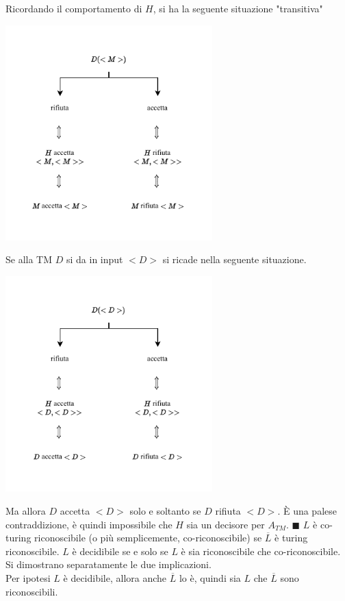 \documentclass[10pt, letterpaper]{report}
\begin{document}
Ricordando il comportamento di $H$, si ha la seguente situazione "transitiva"
\begin{center}
    \includegraphics[width=0.6\textwidth ]{images/ATMnonDec.pdf}
\end{center}
Se alla TM $D$ si da in input $<D>$ si ricade nella seguente situazione.
\begin{center}
    \includegraphics[width=0.6\textwidth ]{images/ATMnonDec2.pdf}
\end{center}
Ma allora $D$ accetta $<D>$ solo e soltanto se $D$ rifiuta $<D>$. È una palese contraddizione, è quindi impossibile che $H$ sia un decisore per $A_{TM}$.
\hfill$\blacksquare$\acc 
{} $L$ è co-turing riconoscibile (o più semplicemente, co-riconoscibile) se $\overline{L}$ è turing riconoscibile.\acc 
\teo{} $L$ è decidibile se e solo se $L$ è sia riconoscibile che co-riconoscibile.\acc 
\dimo{} Si dimostrano separatamente le due implicazioni. \\ 
\boxedMath{$\implies$} Per ipotesi $L$ è decidibile, allora anche $\overline{L}$ lo è, quindi sia $L$ che $\overline{L}$ sono riconoscibili. \\ 
\end{document}

